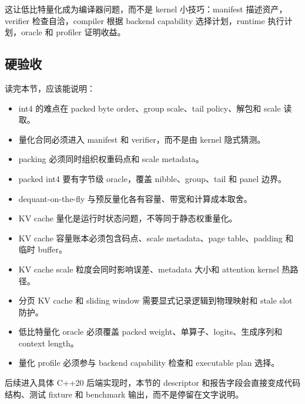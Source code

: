 这让低比特量化成为编译器问题，而不是 kernel 小技巧：manifest 描述资产，verifier 检查自洽，compiler 根据 backend capability 选择计划，runtime 执行计划，oracle 和 profiler 证明收益。

\subsection{硬验收}

读完本节，应该能说明：

\begin{itemize}
  \item int4 的难点在 packed byte order、group scale、tail policy、解包和 scale 读取。
  \item 量化合同必须进入 manifest 和 verifier，而不是由 kernel 隐式猜测。
  \item packing 必须同时组织权重码点和 scale metadata。
  \item packed int4 要有字节级 oracle，覆盖 nibble、group、tail 和 panel 边界。
  \item dequant-on-the-fly 与预反量化各有容量、带宽和计算成本取舍。
  \item KV cache 量化是运行时状态问题，不等同于静态权重量化。
  \item KV cache 容量账本必须包含码点、scale metadata、page table、padding 和临时 buffer。
  \item KV cache scale 粒度会同时影响误差、metadata 大小和 attention kernel 热路径。
  \item 分页 KV cache 和 sliding window 需要显式记录逻辑到物理映射和 stale slot 防护。
  \item 低比特量化 oracle 必须覆盖 packed weight、单算子、logits、生成序列和 context length。
  \item 量化 profile 必须参与 backend capability 检查和 executable plan 选择。
\end{itemize}

后续进入具体 C++20 后端实现时，本节的 descriptor 和报告字段会直接变成代码结构、测试 fixture 和 benchmark 输出，而不是停留在文字说明。
